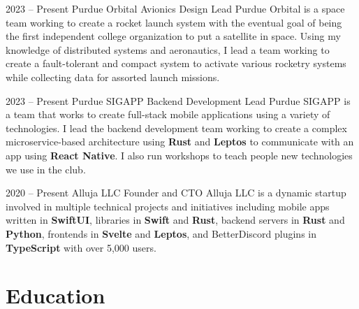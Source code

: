 \documentclass[
	10pt, %
]{FreemanCV}
\begin{document}
\begin{paracol}{2}

\jobentry
	{2023 -- Present} %
	{} %
	{Purdue Orbital} %
	{Avionics Design Lead} %
	{Purdue Orbital is a space team working to create a rocket launch system with the eventual goal of being the first independent college organization to put a satellite in space. Using my knowledge of distributed systems and aeronautics, I lead a team working to create a fault-tolerant and compact system to activate various rocketry systems while collecting data for assorted launch missions.} %

\jobentry
	{2023 -- Present} %
	{} %
	{Purdue SIGAPP} %
	{Backend Development Lead} %
	{Purdue SIGAPP is a team that works to create full-stack mobile applications using a variety of technologies. I lead the backend development team working to create a complex microservice-based architecture using \textbf{Rust} and \textbf{Leptos} to communicate with an app using \textbf{React Native}. I also run workshops to teach people new technologies we use in the club.} %

\jobentry
	{2020 -- Present} %
	{} %
	{Alluja LLC} %
	{Founder and CTO} %
	{Alluja LLC is a dynamic startup involved in multiple technical projects and initiatives including mobile apps written in \textbf{SwiftUI}, libraries in \textbf{Swift} and \textbf{Rust}, backend servers in \textbf{Rust} and \textbf{Python}, frontends in \textbf{Svelte} and \textbf{Leptos}, and BetterDiscord plugins in \textbf{TypeScript} with over 5,000 users.} %


\section{Education}




\end{paracol}
\end{document}
